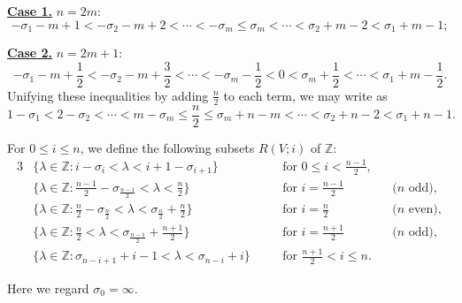 \par\noindent
{\bf{\underline{Case 1.}}}\enspace
$n=2m$:
\[
   -\sigma_1-m+1< -\sigma_2-m+2
   < \cdots < -\sigma_m
   \le \sigma_m 
   < \cdots < \sigma_2 + m-2 < \sigma_1 + m-1;
\]
\par\noindent
{\bf{\underline{Case 2.}}}\enspace
$n=2m+1$:
\[
-\sigma_1-m+\frac 12< -\sigma_2-m+\frac 32
   < \cdots < -\sigma_{m}-\frac 1 2 < 0 
   < \sigma_{m}+ \frac 1 2 
   < \cdots < \sigma_1 + m-\frac 1 2.  
\]
Unifying these inequalities
 by adding $\frac n 2$
 to each term, 
 we may write as 
\[
  1-\sigma_1 < 2-\sigma_2 < \cdots< m - \sigma_m
  \le 
  \frac n 2
  \le \sigma_m + n-m
  < \cdots
  < \sigma_2 + n-2
  < \sigma_1 + n-1.  
\]
\begin{definition}
\label{def:RVi}
For $0 \le i \le n$, 
 we define the following subsets
 $R(V;i)$
 of ${\mathbb{Z}}$:
\begin{alignat*}{3}
&\{\lambda \in {\mathbb{Z}}: i - \sigma_{i} < \lambda < i+1-\sigma_{i+1}\}
\quad
&&\text{for $0 \le i < \frac {n-1} 2$}, 
&&
\\
&\{\lambda \in {\mathbb{Z}}: \frac{n-1}2 -\sigma_{\frac{n-1}2} < \lambda < \frac n 2\}
\quad
&&\text{for $i = \frac {n-1} 2$} \quad 
&&\text{($n$ odd)},  
\\
&\{\lambda \in {\mathbb{Z}}: \frac n 2-\sigma_{\frac n 2} < \lambda < \sigma_{\frac n 2}+\frac n 2\}
\quad
&&\text{for $i = \frac n 2$}
&&\text{($n$ even)}, 
\\
&\{\lambda \in {\mathbb{Z}}: \frac n 2 < \lambda < \sigma_{\frac {n-1} 2}+\frac {n+1} 2\}
\quad
&&\text{for $i = \frac {n+1} 2$}
&&\text{($n$ odd)}, 
\\
&\{\lambda \in {\mathbb{Z}}: \sigma_{n-i+1} +i-1< \lambda < \sigma_{n-i}+i\}
\quad
&&\text{for $\frac{n+1}2 < i \le n$}.  
&&
\end{alignat*}
\end{definition}
Here we regard $\sigma_0=\infty$.  
